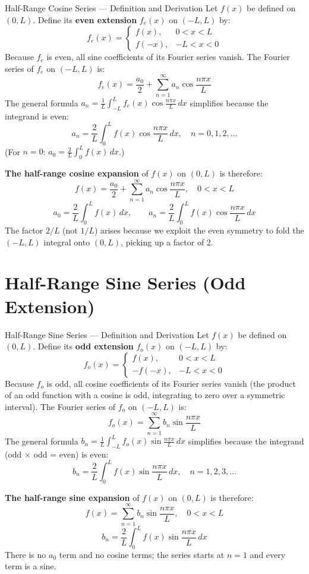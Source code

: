 \documentclass[12pt,a4paper]{article}
\begin{document}
\begin{infobox}{Half-Range Cosine Series --- Definition and Derivation}
Let $f(x)$ be defined on $(0,L)$. Define its \textbf{even extension} $f_e(x)$ on $(-L,L)$ by:
\[
  f_e(x) = \begin{cases} f(x), & 0 < x < L \\ f(-x), & -L < x < 0 \end{cases}
\]
Because $f_e$ is even, all sine coefficients of its Fourier series vanish. The Fourier series of $f_e$ on $(-L,L)$ is:
\[
  f_e(x) = \frac{a_0}{2} + \sum_{n=1}^{\infty} a_n \cos\frac{n\pi x}{L}
\]
The general formula $a_n = \frac{1}{L}\int_{-L}^{L} f_e(x)\cos\frac{n\pi x}{L}\,dx$ simplifies because the integrand is even:
\[
  a_n = \frac{2}{L}\int_{0}^{L} f(x)\cos\frac{n\pi x}{L}\,dx, \quad n = 0, 1, 2, \ldots
\]
(For $n=0$: $a_0 = \frac{2}{L}\int_0^L f(x)\,dx$.)

\textbf{The half-range cosine expansion} of $f(x)$ on $(0,L)$ is therefore:
\[
  \boxed{f(x) = \frac{a_0}{2} + \sum_{n=1}^{\infty} a_n \cos\frac{n\pi x}{L}, \quad 0 < x < L}
\]
\[
  a_0 = \frac{2}{L}\int_0^L f(x)\,dx, \qquad a_n = \frac{2}{L}\int_0^L f(x)\cos\frac{n\pi x}{L}\,dx
\]
The factor $2/L$ (not $1/L$) arises because we exploit the even symmetry to fold the $(-L,L)$ integral onto $(0,L)$, picking up a factor of 2.
\end{infobox}

\section{Half-Range Sine Series (Odd Extension)}

\begin{infobox}{Half-Range Sine Series --- Definition and Derivation}
Let $f(x)$ be defined on $(0,L)$. Define its \textbf{odd extension} $f_o(x)$ on $(-L,L)$ by:
\[
  f_o(x) = \begin{cases} f(x), & 0 < x < L \\ -f(-x), & -L < x < 0 \end{cases}
\]
Because $f_o$ is odd, all cosine coefficients of its Fourier series vanish (the product of an odd function with a cosine is odd, integrating to zero over a symmetric interval). The Fourier series of $f_o$ on $(-L,L)$ is:
\[
  f_o(x) = \sum_{n=1}^{\infty} b_n \sin\frac{n\pi x}{L}
\]
The general formula $b_n = \frac{1}{L}\int_{-L}^{L} f_o(x)\sin\frac{n\pi x}{L}\,dx$ simplifies because the integrand (odd $\times$ odd = even) is even:
\[
  b_n = \frac{2}{L}\int_{0}^{L} f(x)\sin\frac{n\pi x}{L}\,dx, \quad n = 1, 2, 3, \ldots
\]

\textbf{The half-range sine expansion} of $f(x)$ on $(0,L)$ is therefore:
\[
  \boxed{f(x) = \sum_{n=1}^{\infty} b_n \sin\frac{n\pi x}{L}, \quad 0 < x < L}
\]
\[
  b_n = \frac{2}{L}\int_0^L f(x)\sin\frac{n\pi x}{L}\,dx
\]
There is no $a_0$ term and no cosine terms; the series starts at $n=1$ and every term is a sine.
\end{infobox}
\end{document}

